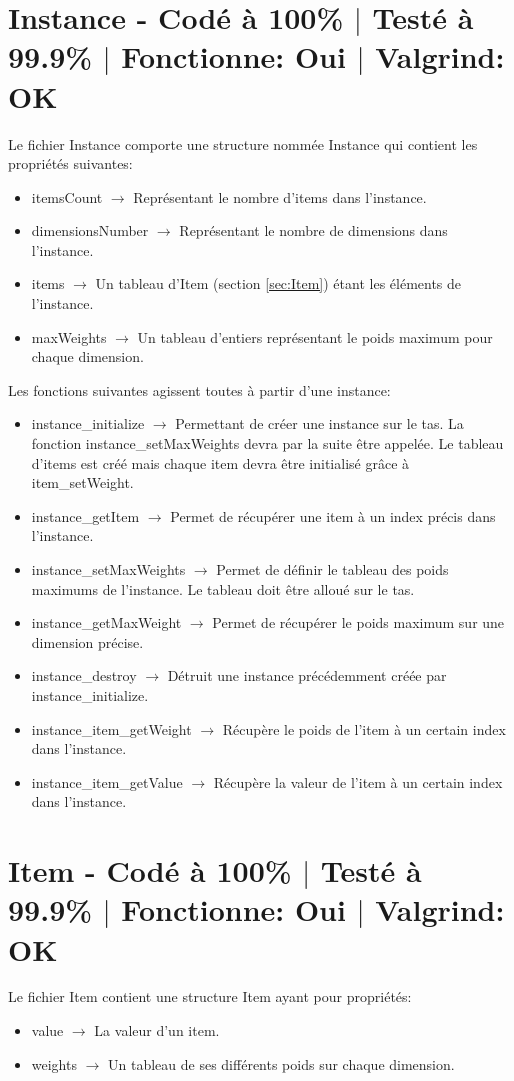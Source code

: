 \documentclass{EPUProjetPeiP}
\newcommand{\comp}[5]{
	\section[#1]{#1 {\small - Codé à #2\% $\vert$ Testé à #3\% $\vert$ Fonctionne: #4 $\vert$ Valgrind: #5}}
}
\begin{document}
\comp{Instance}{100}{99.9}{Oui}{OK}
Le fichier Instance comporte une structure nommée Instance qui contient les propriétés suivantes:
\begin{itemize}
	\item itemsCount $\longrightarrow$ Représentant le nombre d'items dans l'instance.
	\item dimensionsNumber $\longrightarrow$ Représentant le nombre de dimensions dans l'instance.
	\item items $\longrightarrow$ Un tableau d'Item (section \ref{sec:Item}) étant les éléments de l'instance.
	\item maxWeights $\longrightarrow$ Un tableau d'entiers représentant le poids maximum pour chaque dimension.\\
\end{itemize}

Les fonctions suivantes agissent toutes à partir d'une instance:
\begin{itemize}
	\item instance\_initialize $\longrightarrow$ Permettant de créer une instance sur le tas. La fonction instance\_setMaxWeights devra par la suite être appelée. Le tableau d'items est créé mais chaque item devra être initialisé grâce à item\_setWeight.
	\item instance\_getItem $\longrightarrow$ Permet de récupérer une item à un index précis dans l'instance.
	\item instance\_setMaxWeights $\longrightarrow$ Permet de définir le tableau des poids maximums de l'instance. Le tableau doit être alloué sur le tas.
	\item instance\_getMaxWeight $\longrightarrow$ Permet de récupérer le poids maximum sur une dimension précise.
	\item instance\_destroy $\longrightarrow$ Détruit une instance précédemment créée par instance\_initialize.
	\item instance\_item\_getWeight $\longrightarrow$ Récupère le poids de l'item à un certain index dans l'instance.
	\item instance\_item\_getValue $\longrightarrow$ Récupère la valeur de l'item à un certain index dans l'instance.
\end{itemize}

\comp{Item \label{sec:Item}}{100}{99.9}{Oui}{OK}
Le fichier Item contient une structure Item ayant pour propriétés:
\begin{itemize}
	\item value $\longrightarrow$ La valeur d'un item.
	\item weights $\longrightarrow$ Un tableau de ses différents poids sur chaque dimension.\\
\end{itemize}
\end{document}
